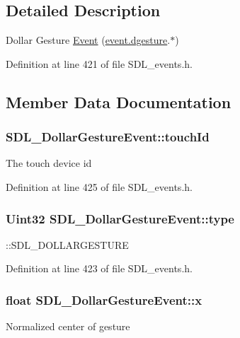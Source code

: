 \subsection{Detailed Description}
Dollar Gesture \hyperlink{classEvent}{Event} (\hyperlink{unionSDL__Event_a4481167b9f8549aeb254e97ca812e74d}{event.\+dgesture}.$\ast$) 

Definition at line 421 of file S\+D\+L\+\_\+events.\+h.



\subsection{Member Data Documentation}
\hypertarget{structSDL__DollarGestureEvent_a40402f6911ed0dba48e6b23aa02bd83d}{
\subsubsection[{touch\+Id}]{ S\+D\+L\+\_\+\+Dollar\+Gesture\+Event\+::touch\+Id}}\label{structSDL__DollarGestureEvent_a40402f6911ed0dba48e6b23aa02bd83d}
The touch device id 

Definition at line 425 of file S\+D\+L\+\_\+events.\+h.

\hypertarget{structSDL__DollarGestureEvent_ac7f6948754a1b2eb36edde043bf75ce9}{
\subsubsection[{type}]{\setlength{\rightskip}{0pt plus 5cm}Uint32 S\+D\+L\+\_\+\+Dollar\+Gesture\+Event\+::type}}\label{structSDL__DollarGestureEvent_ac7f6948754a1b2eb36edde043bf75ce9}
\+::\+S\+D\+L\+\_\+\+D\+O\+L\+L\+A\+R\+G\+E\+S\+T\+U\+R\+E 

Definition at line 423 of file S\+D\+L\+\_\+events.\+h.

\hypertarget{structSDL__DollarGestureEvent_a9888449bd8842ed96494b4db16a6097b}{
\subsubsection[{x}]{\setlength{\rightskip}{0pt plus 5cm}float S\+D\+L\+\_\+\+Dollar\+Gesture\+Event\+::x}}\label{structSDL__DollarGestureEvent_a9888449bd8842ed96494b4db16a6097b}
Normalized center of gesture 

